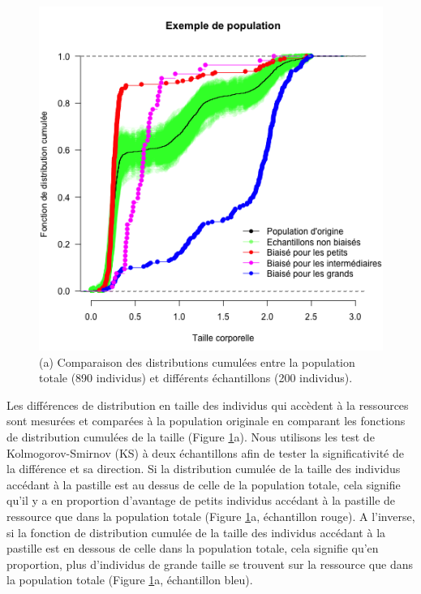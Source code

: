 \begin{figure}[!ht]
\begin{center}
\includegraphics[width=1\textwidth]{1_CorpsDeThese/Resumes/Fig/SM02}
\caption[Comparaison des
distributions cumulées]{(a) Comparaison des distributions cumulées entre la
population totale (890 individus) et différents échantillons (200 individus).
}
\label{fig:SM2}
\end{center}
\end{figure}

Les différences de distribution en taille des individus qui accèdent à la
ressources sont mesurées et comparées à la population originale en comparant les
fonctions de distribution cumulées de la taille (Figure \ref{fig:SM2}a). Nous
utilisons les test de Kolmogorov-Smirnov (KS) à deux échantillons afin de tester
la significativité de la différence et sa direction. Si la distribution cumulée
de la taille des individus accédant à la pastille est au dessus de celle de la
population totale, cela signifie qu'il y a en proportion d'avantage de petits
individus accédant à la pastille de ressource que dans la population totale
(Figure \ref{fig:SM2}a, échantillon rouge). A l'inverse, si la fonction de
distribution cumulée de la taille des individus accédant à la pastille est en
dessous de celle dans la population totale, cela signifie qu'en proportion, plus
d'individus de grande taille se trouvent sur la ressource que dans la population
totale (Figure \ref{fig:SM2}a, échantillon bleu).

